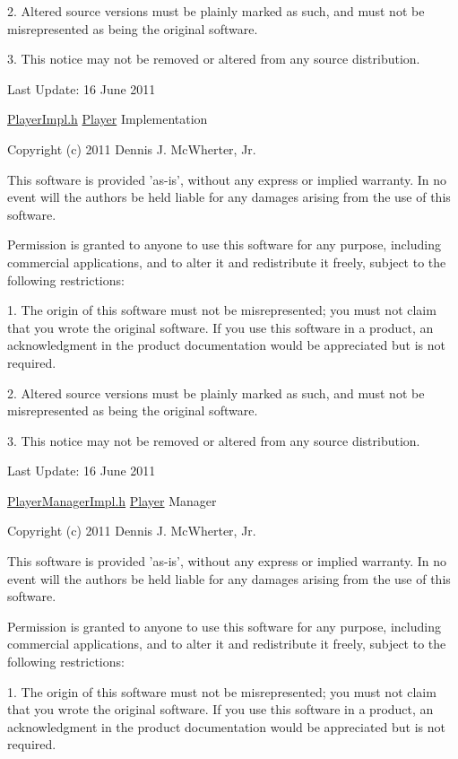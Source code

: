 2. Altered source versions must be plainly marked as such, and must not be misrepresented as being the original software.

3. This notice may not be removed or altered from any source distribution.

Last Update: 16 June 2011

\hyperlink{_player_impl_8h_source}{PlayerImpl.h} \hyperlink{class_micro_f_p_s_1_1_player}{Player} Implementation

Copyright (c) 2011 Dennis J. McWherter, Jr.

This software is provided 'as-\/is', without any express or implied warranty. In no event will the authors be held liable for any damages arising from the use of this software.

Permission is granted to anyone to use this software for any purpose, including commercial applications, and to alter it and redistribute it freely, subject to the following restrictions:

1. The origin of this software must not be misrepresented; you must not claim that you wrote the original software. If you use this software in a product, an acknowledgment in the product documentation would be appreciated but is not required.

2. Altered source versions must be plainly marked as such, and must not be misrepresented as being the original software.

3. This notice may not be removed or altered from any source distribution.

Last Update: 16 June 2011

\hyperlink{_player_manager_impl_8h_source}{PlayerManagerImpl.h} \hyperlink{class_micro_f_p_s_1_1_player}{Player} Manager

Copyright (c) 2011 Dennis J. McWherter, Jr.

This software is provided 'as-\/is', without any express or implied warranty. In no event will the authors be held liable for any damages arising from the use of this software.

Permission is granted to anyone to use this software for any purpose, including commercial applications, and to alter it and redistribute it freely, subject to the following restrictions:

1. The origin of this software must not be misrepresented; you must not claim that you wrote the original software. If you use this software in a product, an acknowledgment in the product documentation would be appreciated but is not required.

